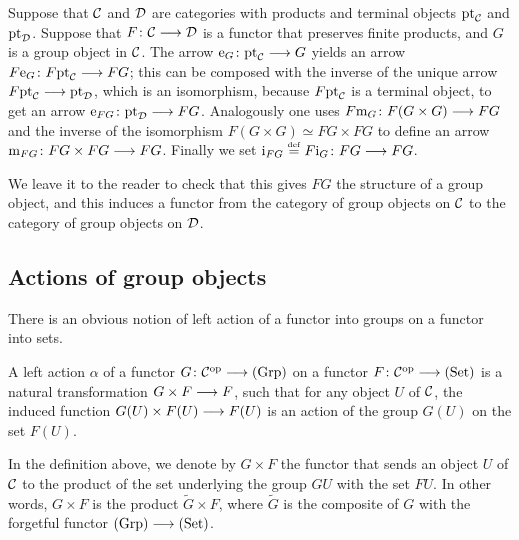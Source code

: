 \begin{2   CONTRAVARIANT FUNCTORS}
\begin{2.2 Group objects}
\begin{remark}\label{rmk:preserve-products->preserve-groups}

Suppose that $\mathcal{C}$ and $\mathcal{D}$ are categories with products and terminal objects $\mathrm{pt}_{\mathcal{C}}$ and $\mathrm{pt}_{\mathcal{D}}$. Suppose that $F \colon \cC \arr \cD$ is a functor that preserves finite products, and $G$ is a group object in $\mathcal{C}$. The arrow $\iden_G \colon \pt_{\cC} \arr G$ yields an arrow $F\iden_G \colon F\pt_{\cC} \arr FG$; this can be composed with the inverse of the unique arrow $F\pt_{\cC} \arr \pt_{\cD}$, which is an isomorphism, because $F\mathrm{pt}_{\mathcal{C}}$ is a terminal object, to get an arrow $\iden_{FG} \colon \pt_{\cD} \arr FG$. Analogously one uses $F\mul_{G} \colon F(G \times G) \arr FG$ and the inverse of the isomorphism $F(G \times G) \simeq FG \times FG$ to define an arrow $\mul_{FG} \colon FG \times FG \arr FG$. Finally we set $\inv_{FG} \eqdef F\inv_{G} \colon FG \arr FG$.

We leave it to the reader to check that this gives $FG$ the structure of a group object, and this induces a functor from the category of group objects on $\mathcal{C}$ to the category of group objects on $\mathcal{D}$.
\end{remark}






\subsection{Actions of group objects}\label{subsec:actions}


There is an obvious notion of left action of a functor into groups on a functor into sets.

\begin{definition}
A left action $\alpha$ of a functor $G \colon \cC\op \arr \catgrp$ on a functor $F \colon \cC\op \arr \catset$ is a natural transformation $G \times F \arr F$, such that for any object $U$ of $\mathcal{C}$, the induced function $G(U) \times F(U) \arr F(U)$ is an action of the group $G(U)$ on the set $F(U)$.
\end{definition}

In the definition above, we denote by $G \times F$ the functor that sends an object $U$ of $\mathcal{C}$ to the product of the set underlying the group $GU$ with the set $FU$. In other words, $G \times F$ is the product $\widetilde{G} \times F$, where $\widetilde{G}$ is the composite of $G$ with the forgetful functor $\catgrp \arr \catset$.


\end{2.2 Group objects}
\end{2   CONTRAVARIANT FUNCTORS}

